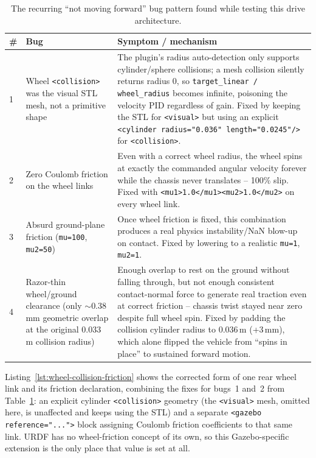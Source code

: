 \begin{table}[htbp]
  \centering
  \caption{The recurring ``not moving forward'' bug pattern found while testing this drive architecture.}
  \label{tab:not-moving-bugs}
  \small
  \begin{tabular}{@{}p{0.6cm}p{5.3cm}p{7cm}@{}}
    \toprule
    \# & Bug & Symptom / mechanism \\
    \midrule
    1 & Wheel \texttt{<collision>} was the visual STL mesh, not a primitive shape & The plugin's radius auto-detection only supports cylinder/sphere collisions; a mesh collision silently returns radius 0, so \texttt{target\_linear / wheel\_radius} becomes infinite, poisoning the velocity PID regardless of gain. Fixed by keeping the STL for \texttt{<visual>} but using an explicit \texttt{<cylinder radius="0.036" length="0.0245"/>} for \texttt{<collision>}. \\
    2 & Zero Coulomb friction on the wheel links & Even with a correct wheel radius, the wheel spins at exactly the commanded angular velocity forever while the chassis never translates -- 100\% slip. Fixed with \texttt{<mu1>1.0</mu1><mu2>1.0</mu2>} on every wheel link. \\
    3 & Absurd ground-plane friction (\texttt{mu=100}, \texttt{mu2=50}) & Once wheel friction is fixed, this combination produces a real physics instability/NaN blow-up on contact. Fixed by lowering to a realistic \texttt{mu=1}, \texttt{mu2=1}. \\
    4 & Razor-thin wheel/ground clearance (only $\sim$0.38\,mm geometric overlap at the original 0.033\,m collision radius) & Enough overlap to rest on the ground without falling through, but not enough consistent contact-normal force to generate real traction even at correct friction -- chassis twist stayed near zero despite full wheel spin. Fixed by padding the collision cylinder radius to 0.036\,m (+3\,mm), which alone flipped the vehicle from ``spins in place'' to sustained forward motion. \\
    \bottomrule
  \end{tabular}
\end{table}

Listing~\ref{lst:wheel-collision-friction} shows the corrected form of
one rear wheel link and its friction declaration, combining the fixes
for bugs~1 and~2 from Table~\ref{tab:not-moving-bugs}: an explicit
cylinder \texttt{<collision>} geometry (the \texttt{<visual>} mesh,
omitted here, is unaffected and keeps using the STL) and a separate
\texttt{<gazebo reference="...">} block assigning Coulomb friction
coefficients to that same link. URDF has no wheel-friction concept
of its own, so this Gazebo-specific extension is the only place that
value is set at all.

